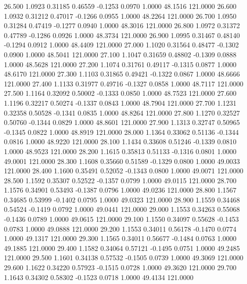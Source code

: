   26.500   1.0923   0.31185   0.46559  -0.1253   0.0970   1.0000  48.1516 121.0000
  26.600   1.0932   0.31212   0.47017  -0.1266   0.0955   1.0000  48.2264 121.0000
  26.700   1.0950   0.31284   0.47419  -0.1277   0.0940   1.0000  48.3016 121.0000
  26.800   1.0972   0.31372   0.47789  -0.1286   0.0926   1.0000  48.3734 121.0000
  26.900   1.0995   0.31467   0.48140  -0.1294   0.0912   1.0000  48.4409 121.0000
  27.000   1.1020   0.31564   0.48477  -0.1302   0.0900   1.0000  48.5041 121.0000
  27.100   1.1047   0.31659   0.48802  -0.1309   0.0888   1.0000  48.5628 121.0000
  27.200   1.1074   0.31761   0.49117  -0.1315   0.0877   1.0000  48.6170 121.0000
  27.300   1.1103   0.31865   0.49421  -0.1322   0.0867   1.0000  48.6666 121.0000
  27.400   1.1133   0.31977   0.49716  -0.1327   0.0858   1.0000  48.7117 121.0000
  27.500   1.1164   0.32092   0.50002  -0.1333   0.0850   1.0000  48.7523 121.0000
  27.600   1.1196   0.32217   0.50274  -0.1337   0.0843   1.0000  48.7904 121.0000
  27.700   1.1231   0.32358   0.50528  -0.1341   0.0835   1.0000  48.8264 121.0000
  27.800   1.1270   0.32527   0.50760  -0.1344   0.0829   1.0000  48.8601 121.0000
  27.900   1.1313   0.32747   0.50965  -0.1345   0.0822   1.0000  48.8919 121.0000
  28.000   1.1364   0.33062   0.51136  -0.1344   0.0816   1.0000  48.9220 121.0000
  28.100   1.1434   0.33608   0.51246  -0.1339   0.0810   1.0000  48.9523 121.0000
  28.200   1.1615   0.35813   0.51133  -0.1316   0.0801   1.0000  49.0001 121.0000
  28.300   1.1608   0.35660   0.51589  -0.1329   0.0800   1.0000  49.0033 121.0000
  28.400   1.1600   0.35491   0.52052  -0.1343   0.0800   1.0000  49.0071 121.0000
  28.500   1.1592   0.35307   0.52522  -0.1357   0.0799   1.0000  49.0115 121.0000
  28.700   1.1576   0.34901   0.53493  -0.1387   0.0796   1.0000  49.0236 121.0000
  28.800   1.1567   0.34685   0.53999  -0.1402   0.0795   1.0000  49.0323 121.0000
  28.900   1.1559   0.34468   0.54524  -0.1419   0.0792   1.0000  49.0441 121.0000
  29.000   1.1553   0.34263   0.55068  -0.1436   0.0789   1.0000  49.0615 121.0000
  29.100   1.1550   0.34097   0.55628  -0.1453   0.0783   1.0000  49.0888 121.0000
  29.200   1.1553   0.34011   0.56178  -0.1470   0.0774   1.0000  49.1317 121.0000
  29.300   1.1565   0.34011   0.56677  -0.1484   0.0763   1.0000  49.1885 121.0000
  29.400   1.1582   0.34064   0.57121  -0.1495   0.0751   1.0000  49.2485 121.0000
  29.500   1.1601   0.34138   0.57532  -0.1505   0.0739   1.0000  49.3069 121.0000
  29.600   1.1622   0.34220   0.57923  -0.1515   0.0728   1.0000  49.3620 121.0000
  29.700   1.1643   0.34302   0.58302  -0.1523   0.0718   1.0000  49.4134 121.0000
